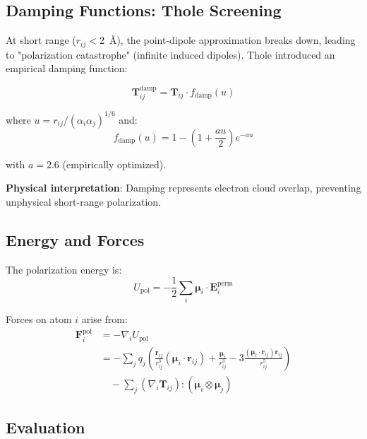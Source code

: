\documentclass[11pt,letterpaper]{article}
\newcommand{\vr}{\mathbf{r}}
\newcommand{\vf}{\mathbf{F}}
\newcommand{\vE}{\mathbf{E}}
\newcommand{\vmu}{\boldsymbol{\mu}}
\begin{document}
\subsection{Damping Functions: Thole Screening}

At short range ($r_{ij} < 2$~\AA), the point-dipole approximation breaks down, leading to "polarization catastrophe" (infinite induced dipoles). Thole introduced an empirical damping function\cite{thole1981}:

\begin{equation}
\mathbf{T}_{ij}^{\text{damp}} = \mathbf{T}_{ij} \cdot f_{\text{damp}}(u)
\end{equation}

where $u = r_{ij} / (\alpha_i \alpha_j)^{1/6}$ and:
\begin{equation}
f_{\text{damp}}(u) = 1 - \left(1 + \frac{au}{2}\right) e^{-au}
\end{equation}

with $a = 2.6$ (empirically optimized).

\textbf{Physical interpretation}: Damping represents electron cloud overlap, preventing unphysical short-range polarization.

\subsection{Energy and Forces}

The polarization energy is:
\begin{equation}
U_{\text{pol}} = -\frac{1}{2} \sum_i \vmu_i \cdot \vE_i^{\text{perm}}
\end{equation}

Forces on atom $i$ arise from:
\begin{align}
\vf_i^{\text{pol}} &= -\nabla_i U_{\text{pol}} \\
&= -\sum_j q_j \left( \frac{\vr_{ij}}{r_{ij}^3} (\vmu_i \cdot \vr_{ij}) + \frac{\vmu_i}{r_{ij}^3} - 3\frac{(\vmu_i \cdot \vr_{ij})\vr_{ij}}{r_{ij}^5} \right) \\
&\quad - \sum_j \left( \nabla_i \mathbf{T}_{ij} \right) : (\vmu_i \otimes \vmu_j)
\end{align}

\subsection{Evaluation}
\end{document}
